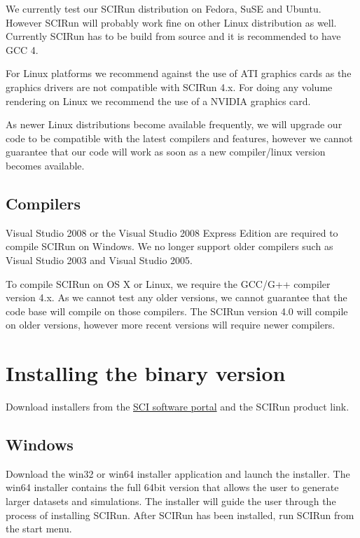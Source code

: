 \documentclass[fleqn,12pt,openany]{book}
\begin{document}
We currently test our SCIRun distribution on Fedora, SuSE and Ubuntu.
However SCIRun will probably work fine on other Linux distribution as well.
Currently SCIRun has to be build from source and it is recommended to have GCC 4.

For Linux platforms we recommend against the use of ATI graphics cards as the graphics drivers are not compatible with SCIRun 4.x.
For doing any volume rendering on Linux we recommend the use of a NVIDIA graphics card.

As newer Linux distributions become available frequently, we will upgrade our code to be compatible with the latest
compilers and features, however we cannot guarantee that our code will work as soon as a new compiler/linux version
becomes available. 

\subsection{Compilers}

Visual Studio 2008 or the Visual Studio 2008 Express Edition are required to compile SCIRun on Windows.
We no longer support older compilers such as Visual Studio 2003 and Visual Studio 2005.

To compile SCIRun on OS X or Linux, we require the GCC/G++ compiler version 4.x.
As we cannot test any older versions, we cannot guarantee that the code base will compile on those compilers.
The SCIRun version 4.0 will compile on older versions, however more recent versions will require newer compilers.

\section{Installing the binary version}

Download installers from the
\href{http://software.sci.utah.edu}{SCI software portal}
and the SCIRun product link.

\subsection{Windows}

Download the win32 or win64 installer application and launch the installer.
The win64 installer contains the full 64bit version that allows the user to generate larger datasets and simulations.
The installer will guide the user through the process of installing SCIRun.
After SCIRun has been installed, run SCIRun from the start menu. 
\end{document}
